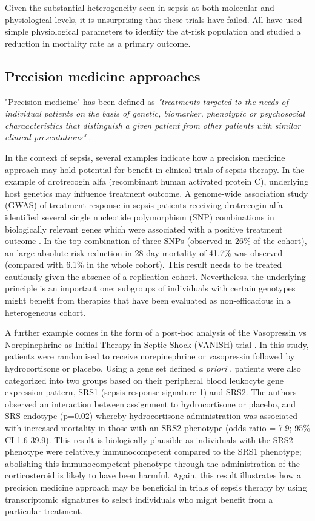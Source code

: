 Given the substantial heterogeneity seen in sepsis at both molecular and physiological levels, it is unsurprising that these trials have failed. All have used simple physiological parameters to identify the at-risk population and studied a reduction in mortality rate as a primary outcome. 

\subsection{Precision medicine approaches}
"Precision medicine" has been defined as \textit{"treatments targeted to the needs of individual patients on the basis of genetic, biomarker, phenotypic or psychosocial charaacteristics that distinguish a given patient from other patients with similar clinical presentations"} \parencite{Jameson2015}. 

In the context of sepsis, several examples indicate how a precision medicine approach may hold potential for benefit in clinical trials of sepsis therapy. In the example of drotrecogin alfa (recombinant human activated protein C), underlying host genetics may influence treatment outcome. A genome-wide association study (GWAS) of treatment response in sepsis patients receiving drotrecogin alfa identified several single nucleotide polymorphism (SNP) combinations in biologically relevant genes which were associated with a positive treatment outcome \parencite{Man2013}. In the top combination of three SNPs (observed in 26\% of the cohort), an large absolute risk reduction in 28-day mortality of 41.7\% was observed (compared with 6.1\% in the whole cohort). This result needs to be treated cautiously given the absence of a replication cohort. Nevertheless. the underlying principle is an important one; subgroups of individuals with certain genotypes might benefit from therapies that have been evaluated as non-efficacious in a heterogeneous cohort. 

A further example comes in the form of a post-hoc analysis of the Vasopressin vs Norepinephrine as Initial Therapy in Septic Shock (VANISH) trial \parencite{Antcliffe2019}. In this study, patients were randomised to receive norepinephrine or vasopressin followed by hydrocortisone or placebo. Using a gene set defined \textit{a priori} \parencite{Davenport2016}, patients were also categorized into two groups based on their peripheral blood leukocyte gene expression pattern, SRS1 (sepsis response signature 1) and SRS2. The authors observed an interaction between assignment to hydrocortisone or placebo, and SRS endotype (p=0.02) whereby hydrocortisone administration was associated with increased mortality in those with an SRS2 phenotype (odds ratio = 7.9; 95\% CI 1.6-39.9). This result is biologically plausible as individuals with the SRS2 phenotype were relatively immunocompetent compared to the SRS1 phenotype; abolishing this immunocompetent phenotype through the administration of the corticosteroid is likely to have been harmful. Again, this result illustrates how a precision medicine approach may be beneficial in trials of sepsis therapy by using transcriptomic signatures to select individuals who might benefit from a particular treatment.


